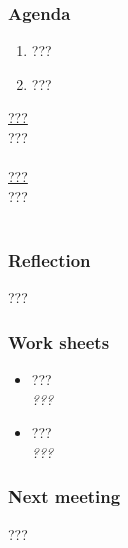 \documentclass[a4paper,11pt]{article}
\begin{document}
\subsubsection*{Agenda}
\begin{enumerate}
	\item ???
	\item ???
\end{enumerate}
\underline{???} \\
??? \\ \\
\underline{???} \\
??? \\ \\

\subsubsection*{Reflection}
???

\subsubsection*{Work sheets}
\begin{itemize}
	\item ??? \\
		\textsl{???}
	\item ??? \\
		\textsl{???}
\end{itemize}

\subsubsection*{Next meeting}
???
\end{document}
